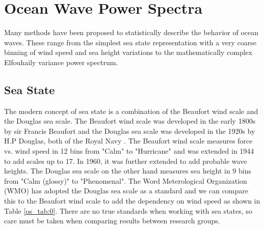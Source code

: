 \section{Ocean Wave Power Spectra}  \label{os_sec:power_spectra}
Many methods have been proposed to statistically describe the behavior of ocean waves. These range from the simplest sea state representation with a very coarse binning of wind speed and sea height variations to the mathematically complex Elfouhaily variance power spectrum.

\subsection {Sea State}
The modern concept of sea state is a combination of the Beaufort wind scale and the Douglas sea scale. The Beaufort wind scale was developed in the early 1800s by sir Francis Beaufort and the Douglas sea scale was developed in the 1920s by H.P Douglas, both of the Royal Navy \cite{uk_met_fact_sheet6}. The Beaufort wind scale measures force vs. wind speed in 12 bins from "Calm" to "Hurricane" and was extended in 1944 to add scales up to 17. In 1960, it was further extended to add probable wave heights. The Douglas sea scale on the other hand measures sea height in 9 bins from "Calm (glossy)" to "Phenomenal". The Word Meterological Organization (WMO) has adopted the Douglas sea scale as a standard \cite{wmo_code} and we can compare this to the Beaufort wind scale to add the dependency on wind speed as shown in Table \ref{os_tab:0}. There are no true standards when working with sea states, so care must be taken when comparing results between research groups.

